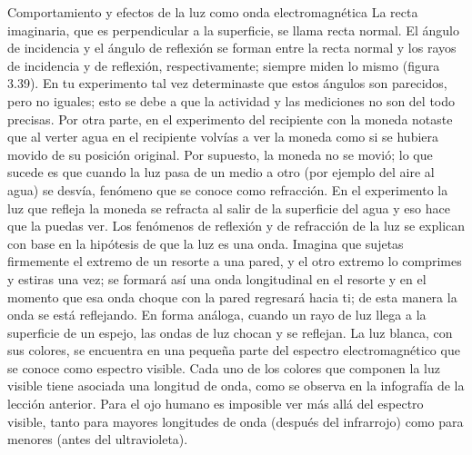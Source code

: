 \documentclass[12pt,addpoints,answers]{guia}
\begin{document}
\begin{questions}
\begin{sectionbox}{Comportamiento y efectos de la luz como onda electromagnética}
        La recta imaginaria, que es perpendicular a la superficie, se llama recta normal. El
        ángulo de incidencia y el ángulo de reflexión se forman entre la recta normal y los rayos de incidencia y de reflexión, respectivamente; siempre miden lo mismo (figura 3.39).
        En tu experimento tal vez determinaste que estos ángulos son parecidos, pero no iguales; esto se debe a que la actividad y las mediciones no son del todo precisas.
        Por otra parte, en el experimento del recipiente con la moneda notaste que al verter
        agua en el recipiente volvías a ver la moneda como si se hubiera movido de su posición
        original. Por supuesto, la moneda no se movió; lo que sucede es que cuando la luz pasa
        de un medio a otro (por ejemplo del aire al agua) se desvía, fenómeno que se conoce como
        refracción. En el experimento la luz que refleja la moneda se refracta
        al salir de la superficie del agua y eso hace que la puedas ver.
        Los fenómenos de reflexión y de refracción de la luz se explican
        con base en la hipótesis de que la luz es una onda. Imagina que
        sujetas firmemente el extremo de un resorte a una pared, y el otro
        extremo lo comprimes y estiras una vez; se formará así una onda
        longitudinal en el resorte y en el momento que esa onda choque
        con la pared regresará hacia ti; de esta manera la onda se está
        reflejando. En forma análoga, cuando un rayo de luz llega a la superficie de un espejo, las ondas de luz chocan y se reflejan.
        La luz blanca, con sus colores, se encuentra en una pequeña parte
        del espectro electromagnético que se conoce como espectro visible.
        Cada uno de los colores que componen la luz visible tiene asociada
        una longitud de onda, como se observa en la infografía de la lección
        anterior. Para el ojo humano es imposible ver más allá del espectro
        visible, tanto para mayores longitudes de onda (después del infrarrojo) como para menores (antes del ultravioleta).

    \end{sectionbox}
    \questionboxed[25]{}
\end{questions}
\end{document}
